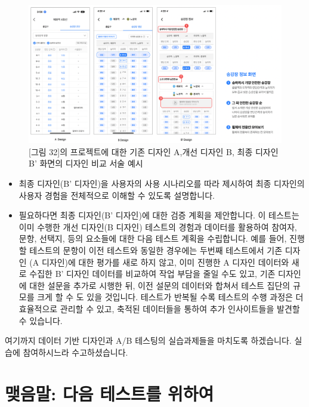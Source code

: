 \documentclass[
  letterpaper,
]{book}
\providecommand{\tightlist}{%
  \setlength{\itemsep}{0pt}\setlength{\parskip}{0pt}}\usepackage{longtable,booktabs,array}
\begin{document}
\begin{figure}[H]

{\centering \includegraphics{img/fig33.png}

}

\caption{{[}그림 32{]}의 프로젝트에 대한 기존 디자인 A,개선 디자인 B,
최종 디자인 B' 화면의 디자인 비교 서술 예시}

\end{figure}%

\begin{itemize}
\tightlist
\item
  최종 디자인(B' 디자인)을 사용자의 사용 시나리오를 따라 제시하여 최종
  디자인의 사용자 경험을 전체적으로 이해할 수 있도록 설명합니다.
\item
  필요하다면 최종 디자인(B' 디자인)에 대한 검증 계획을 제안합니다. 이
  테스트는 이미 수행한 개선 디자인(B 디자인) 테스트의 경험과 데이터를
  활용하여 참여자, 문항, 선택지, 등의 요소들에 대한 다음 테스트 계획을
  수립합니다. 예를 들어, 진행할 테스트의 문항이 이전 테스트와 동일한
  경우에는 두번째 테스트에서 기존 디자인 (A 디자인)에 대한 평가를 새로
  하지 않고, 이미 진행한 A 디자인 데이터와 새로 수집한 B' 디자인
  데이터를 비교하여 작업 부담을 줄일 수도 있고, 기존 디자인에 대한
  설문을 추가로 시행한 뒤, 이전 설문의 데이터와 합쳐서 테스트 집단의
  규모를 크게 할 수 도 있을 것입니다. 테스트가 반복될 수록 테스트의 수행
  과정은 더 효율적으로 관리할 수 있고, 축적된 데이터들을 통하여 추가
  인사이트들을 발견할 수 있습니다.
\end{itemize}

여기까지 데이터 기반 디자인과 A/B 테스팅의 실습과제들을 마치도록
하겠습니다. 실습에 참여하시느라 수고하셨습니다.


\chapter{맺음말: 다음 테스트를
위하여}\label{uxb9fauxc74cuxb9d0-uxb2e4uxc74c-uxd14cuxc2a4uxd2b8uxb97c-uxc704uxd558uxc5ec}
\end{document}
